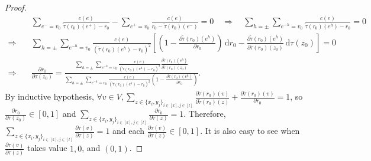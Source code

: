 \documentclass[fleqn]{article}
\theoremstyle{definition}
\theoremstyle{remark}
\renewcommand{\d}{\,\mathrm{d}} %
\begin{document}
\begin{proof}
\begin{align*}
& \sum_{e^- =v_0} \frac{c(e)}{\tilde{\tau}(r_0)(e^+)-r_0} - \sum_{e^+ =v_0} \frac{c(e)}{r_0-\tilde{\tau}(r_0)(e^-)} =0 \quad 
\Rightarrow \quad \sum_{h=\pm}\sum_{e^{-h} =v_0} \frac{c(e)}{\tilde{\tau}(r_0)(e^h)-r_0} =0 \\
\Rightarrow \quad & \sum_{h=\pm}\sum_{e^{-h} =v_0} \frac{c(e)}{\left(\tilde{\tau}(r_0)(e^h)-r_0\right)^2} \left[ \left(1-\frac{\partial \tilde{\tau}(r_0)(e^h)}{\partial r_0}\right) \d r_0 - \frac{\partial \tilde{\tau}(r_0)(e^h)}{\partial \tilde{\tau}(r_0)(z_0)} \d\tau(z_0) \right] =0 \\
\Rightarrow \quad & \frac{\partial r_0}{\partial \tau(z_0)} = \frac{\sum_{h=\pm}\sum_{e^{-h} =v_0} \frac{c(e)}{\left( \tilde{\tau}(r_0)(e^h)-r_0 \right)^2} \frac{\partial \tilde{\tau}(r_0)(e^h)}{\partial \tilde{\tau}(r_0)(z_0)} }{\sum_{h=\pm}\sum_{e^{-h} =v_0} \frac{c(e)}{\left( \tilde{\tau}(r_0)(e^h)-r_0 \right)^2} \left(1-\frac{\partial \tilde{\tau}(r_0)(e^h)}{\partial r_0} \right)}.
\end{align*}
By inductive hypothesis, $\forall v\in V, \sum_{z\in \{x_i,y_j\}_{i\in[k],j\in[l]}} \frac{\partial \tilde{\tau}(r_0)(v)}{\partial \tilde{\tau}(r_0)(z)} + \frac{\partial \tilde{\tau}(r_0)(v)}{\partial r_0} =1$, so $\frac{\partial r_0}{\partial \tau(z_0)} \in[0,1]$ and $\sum_{z\in \{x_i,y_j\}_{i\in[k],j\in[l]}} \frac{\partial r_0}{\partial \tau(z)} =1$. Therefore, $\sum_{z\in \{x_i,y_j\}_{i\in[k],j\in[l]}} \frac{\partial \tau(v)}{\partial \tau(z)} =1$ and each $\frac{\partial \tau(v)}{\partial \tau(z)} \in[0,1]$. It is also easy to see when $\frac{\partial \tau(v)}{\partial \tau(z)}$ takes value $1,0$, and $(0,1)$.
\end{proof}
\end{document}
